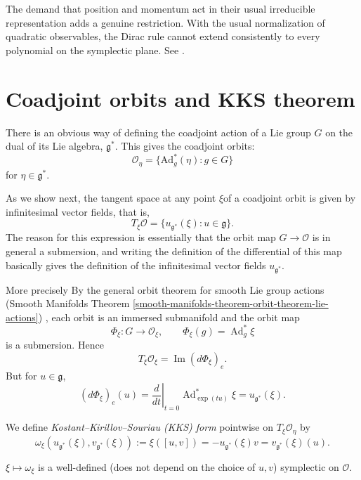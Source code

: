 The demand that position and momentum act
in their usual irreducible representation
adds a genuine restriction. With the usual
normalization of quadratic observables,
the Dirac rule cannot extend consistently
to every polynomial on the symplectic
plane. See \cite[Section 13.4]{hallq}.

\section{Coadjoint orbits and KKS theorem}
\label{section-kks}

\noindent
There is an obvious way
of defining the coadjoint action
of a Lie group $G$ on the dual of its Lie
algebra, $\mathfrak{g}^*$. This gives
the coadjoint orbits:
$$
\mathcal{O}_\eta=
\{\text{Ad}^*_g(\eta):g \in G\}
$$
for $\eta \in \mathfrak{g}^*$.

As we show next,
the tangent space at any
point $\xi $of a coadjoint orbit is given by
infinitesimal vector fields, that is, 
$$
T_{\xi}\mathcal{O}=\{u_{\mathfrak{g}^*}(\xi):
u \in \mathfrak{g}\}.
$$
The reason for this expression
is essentially that the orbit map
$G \to \mathcal{O}$
is in general a submersion, 
and writing the definition
of the differential of this map
basically gives the definition
of the infinitesimal vector fields
$u_{\mathfrak{g}^*}$.

More precisely
By the general orbit theorem for smooth Lie
group actions
(Smooth Manifolds Theorem
\ref{smooth-manifolds-theorem-orbit-theorem-lie-actions})
, each orbit is an immersed
submanifold and the orbit map
$$
\Phi_\xi:G\to \mathcal O_\xi,
\qquad
\Phi_\xi(g)=\operatorname{Ad}_g^*\xi
$$
is a submersion. Hence
$$
T_\xi\mathcal O_\xi
=
\operatorname{Im}(d\Phi_\xi)_e.
$$
But for $u\in\mathfrak g$,
$$
(d\Phi_\xi)_e(u)
=
\left.\frac{d}{dt}\right|_{t=0}
\operatorname{Ad}_{\exp(tu)}^*\xi
=
u_{\mathfrak g^*}(\xi).
$$

\noindent
\begin{definition}
\label{definition-kks}
We define {\it Kostant--Kirillov--Souriau
(KKS) form} pointwise
on $T_\xi \mathcal{O}_\eta$ by
$$
\omega_\xi(u_{\mathfrak{g}^*}(\xi),
v_{\mathfrak{g}^*}(\xi)):=\xi([u,v])
=-u_{\mathfrak{g}^*}(\xi)v
=v_{\mathfrak{g}^*}(\xi)(u).
$$
\end{definition}

\begin{theorem}[KKS]
\label{theorem-kks}
$\xi \mapsto  \omega_\xi$ is 
a well-defined 
(does not depend on the
choice of $u,v$) symplectic on
$\mathcal{O}$.
\end{theorem}


